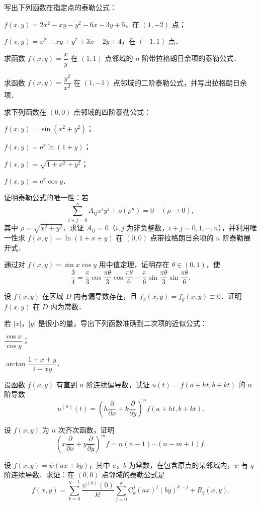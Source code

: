\begin{xiti}
\item 写出下列函数在指定点的泰勒公式：
\begin{ziti}
\item $f(x,y)=2x^{2}-xy-y^{2}-6x-3y+5$，在 $(1,-2)$ 点；
\item $f(x,y)=x^{2}+xy+y^{2}+3x-2y+4$，在 $(-1,1)$ 点．
\end{ziti}
\item 求函数 $f(x,y)=\dfrac{x}{y}$ 在 $(1,1)$ 点邻域的 $n$ 阶带拉格朗日余项的泰勒公式．
\item 求函数 $f(x,y)=\dfrac{y^{2}}{x^{2}}$ 在 $(1,-1)$ 点邻域的二阶泰勒公式，并写出拉格朗日余项．
\item 求下列函数在 $(0,0)$ 点邻域的四阶泰勒公式：
\begin{ziti}
\item $f(x,y)=\sin\left(x^{2}+y^{2}\right)$；
\item $f(x,y)=\mathrm{e}^{x}\ln(1+y)$；
\item $f(x,y)=\sqrt{1+x^{2}+y^{2}}$；
\item $f(x,y)=\mathrm{e}^{x}\cos y$．
\end{ziti}
\item 证明泰勒公式的唯一性：若
\[
\sum_{i+j=0}^{n}A_{ij}x^{i}y^{j}+o\left(\rho^{n}\right)=0\quad(\rho\to 0),
\]
其中 $\rho=\sqrt{x^{2}+y^{2}}$．求证 $A_{ij}=0$（$i,j$ 为非负整数，$i+j=0,1,\cdots,n$），并利用唯一性求 $f(x,y)=\ln(1+x+y)$ 在 $(0,0)$ 点带拉格朗日余项的 $n$ 阶泰勒展开式．
\item 通过对 $f(x,y)=\sin x\cos y$ 用中值定理，证明存在 $\theta\in(0,1)$，使
\[
\frac{3}{4}=\frac{\pi}{3}\cos\frac{\pi\theta}{3}\cos\frac{\pi\theta}{6}-\frac{\pi}{6}\sin\frac{\pi\theta}{3}\sin\frac{\pi\theta}{6}.
\]
\item 设 $f(x,y)$ 在区域 $D$ 内有偏导数存在，且 $f_{x}(x,y)=f_{y}(x,y)\equiv 0$．证明 $f(x,y)$ 在 $D$ 内为常数．
\item 若 $\left|x\right|$，$\left|y\right|$ 是很小的量，导出下列函数准确到二次项的近似公式：
\begin{ziti}
\item $\dfrac{\cos x}{\cos y}$；
\item $\arctan\dfrac{1+x+y}{1-xy}$．
\end{ziti}
\item 设函数 $f(x,y)$ 有直到 $n$ 阶连续偏导数，试证 $u(t)=f(a+ht,b+kt)$ 的 $n$ 阶导数
\[
u^{(n)}(t)=\left(h\frac{\partial}{\partial x}+k\frac{\partial}{\partial y}\right)^{n}f(a+ht,b+kt).
\]
\item 设 $f(x,y)$ 为 $n$ 次齐次函数，证明
\[
\left(x\frac{\partial}{\partial x}+y\frac{\partial}{\partial y}\right)^{m}f=n(n-1)\cdots(n-m+1)f.
\]
\item 设 $f(x,y)=\psi(ax+by)$，其中 $a$，$b$ 为常数，在包含原点的某邻域内，$\psi$ 有 $q$ 阶连续导数．求证：在 $(0,0)$ 点邻域的泰勒公式是
\[
f(x,y)=\sum_{k=0}^{q-1}\frac{\psi^{(k)}(0)}{k!}\sum_{j=0}^{k}\mathrm{C}_{k}^{j}(ax)^{j}(by)^{k-j}+R_{q}(x,y).
\]
\end{xiti}





